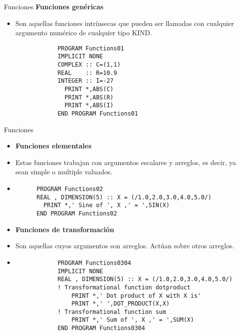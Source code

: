 \begin{frame}[fragile]{Funciones}
\textbf{Funciones genéricas}
 \begin{itemize}[<+(1)->]
  \item Son aquellas funciones intrínsecas que pueden ser llamadas con cualquier argumento numérico de cualquier tipo KIND.
    \vspace{0.1cm}
        \begin{verbatim}
            PROGRAM Functions01
            IMPLICIT NONE
            COMPLEX :: C=(1,1)
            REAL    :: R=10.9
            INTEGER :: I=-27
              PRINT *,ABS(C)
              PRINT *,ABS(R)
              PRINT *,ABS(I)
            END PROGRAM Functions01
        \end{verbatim}
 \end{itemize}
\end{frame}

\begin{frame}[fragile]{Funciones}
 \begin{itemize}[<+(0)->]
  \item [] \textbf{Funciones elementales}
  \item Estas funciones trabajan con argumentos escalares y arreglos, es decir, ya sean simple o multiple valuados.
  \vspace{0.15cm}
  \item[]
      \begin{verbatim}
      PROGRAM Functions02
      REAL , DIMENSION(5) :: X = (/1.0,2.0,3.0,4.0,5.0/)
        PRINT *,' Sine of ', X ,' = ',SIN(X)
      END PROGRAM Functions02
      \end{verbatim}
  \item [] \textbf{Funciones de transformación}
  \item Son aquellas cuyos argumentos son arreglos. Actúan sobre otros arreglos.
  \vspace{0.15cm}
  \item [] 
        \begin{verbatim}
            PROGRAM Functions0304     
            IMPLICIT NONE
            REAL , DIMENSION(5) :: X = (/1.0,2.0,3.0,4.0,5.0/)
            ! Transformational function dotproduct
                PRINT *,' Dot product of X with X is'
                PRINT *,' ',DOT_PRODUCT(X,X)
            ! Transformational function sum
                PRINT *,' Sum of ', X ,' = ',SUM(X)
            END PROGRAM Functions0304
        \end{verbatim}
 \end{itemize}
\end{frame}

